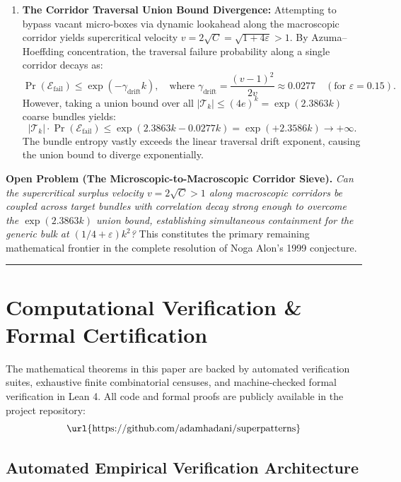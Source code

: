 \documentclass[
  11pt,
]{article}
\begin{document}
\begin{enumerate}
\item \textbf{The Corridor Traversal Union Bound Divergence:}
Attempting to bypass vacant micro-boxes via dynamic lookahead along the macroscopic corridor yields supercritical velocity $v = 2\sqrt{C} = \sqrt{1+4\varepsilon} > 1$. By Azuma--Hoeffding concentration, the traversal failure probability along a single corridor decays as:
\begin{equation}
\Pr(\mathcal{E}_{\mathrm{fail}}) \le \exp(-\gamma_{\mathrm{drift}} k), \quad \text{where } \gamma_{\mathrm{drift}} = \frac{(v-1)^2}{2v} \approx 0.0277 \quad (\text{for } \varepsilon = 0.15).
\end{equation}
However, taking a union bound over all $|\mathcal{T}_k| \le (4e)^k = \exp(2.3863 k)$ coarse bundles yields:
\begin{equation}
|\mathcal{T}_k| \cdot \Pr(\mathcal{E}_{\mathrm{fail}}) \le \exp(2.3863 k - 0.0277 k) = \exp(+2.3586 k) \longrightarrow +\infty.
\end{equation}
The bundle entropy vastly exceeds the linear traversal drift exponent, causing the union bound to diverge exponentially.
\end{enumerate}

\textbf{Open Problem (The Microscopic-to-Macroscopic Corridor Sieve).}
\emph{Can the supercritical surplus velocity $v = 2\sqrt{C} > 1$ along macroscopic corridors be coupled across target bundles with correlation decay strong enough to overcome the $\exp(2.3863 k)$ union bound, establishing simultaneous containment for the generic bulk at $(1/4+\varepsilon)k^2$?}
This constitutes the primary remaining mathematical frontier in the complete resolution of Noga Alon's 1999 conjecture.
\begin{center}\rule{0.5\linewidth}{0.5pt}\end{center}

\section{Computational Verification \& Formal Certification}\label{sec:verification}

The mathematical theorems in this paper are backed by automated verification suites, exhaustive finite combinatorial censuses, and machine-checked formal verification in Lean 4. All code and formal proofs are publicly available in the project repository:
\[\text{\url{https://github.com/adamhadani/superpatterns}}\]

\subsection{Automated Empirical Verification Architecture}\label{sec:empirical-verification}
\end{document}

